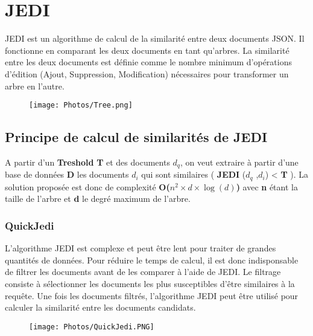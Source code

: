 \section{JEDI}
JEDI \cite{JEDI} est un algorithme de calcul de la similarité entre deux documents JSON. Il fonctionne en comparant les deux documents en tant qu'arbres. La similarité entre les deux documents est définie comme le nombre minimum d'opérations d'édition (Ajout, Suppression, Modification) nécessaires pour transformer un arbre en l'autre. 
\begin{figure}[H]
    \centering
    \texttt{[image: Photos/Tree.png]}
    \caption{\cite{JEDI}}

\end{figure}
\subsection{Principe de calcul de similarités de JEDI}
A partir d'un \textbf{Treshold} \textbf{T} et des documents \textbf{$d_{q}$}, on veut extraire à partir d’une base de données \textbf{D} les documents \textbf{$d_{i}$} qui sont similaires ( \textbf{JEDI} (\textbf{$d_{q}$} ,\textbf{$d_{i}$}) < \textbf{T} ). La solution proposée est donc de complexité \textbf{O($n^{2}\times d \times \log(d)$)} avec \textbf{n} étant la taille de l'arbre et \textbf{d} le degré maximum de l'arbre. 
\subsubsection{QuickJedi}
L'algorithme JEDI est complexe et peut être lent pour traiter de grandes quantités de données. Pour réduire le temps de calcul, il est donc indisponsable de filtrer les documents avant de les comparer à l'aide de JEDI. Le filtrage consiste à sélectionner les documents les plus susceptibles d'être similaires à la requête. Une fois les documents filtrés, l'algorithme JEDI peut être utilisé pour calculer la similarité entre les documents candidats.

\begin{figure}[H]
    \centering
    \texttt{[image: Photos/QuickJedi.PNG]}
    \caption{\cite{JEDI}}

\end{figure}